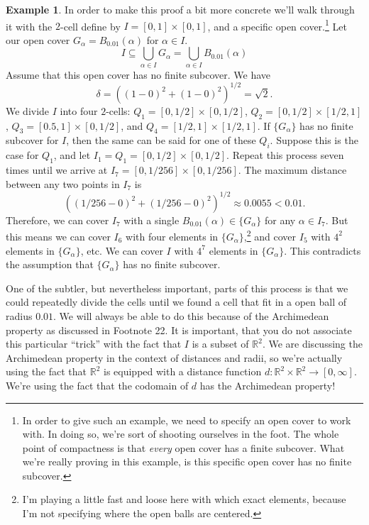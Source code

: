 \documentclass{article}
\newcommand{\R}{\mathbb{R}}
\theoremstyle{definition}
\newtheorem{example}{Example}[section]
\begin{document}
	\begin{example}
		In order to make this proof a bit more concrete we'll walk through it with the $ 2 $-cell define by $ I=[0,1]\times[0,1] $, and a specific open cover.\footnote{In order to give such an example, we need to specify an open cover to work with. In doing so, we're sort of shooting ourselves in the foot. The whole point of compactness is that \textit{every} open cover has a finite subcover. What we're really proving in this example, is this specific open cover has no finite subcover.} Let our open cover $ G_\alpha=B_{0.01}(\alpha)  $ for $ \alpha\in I $. $$ I\subseteq \bigcup_{\alpha\in I} G_\alpha=\bigcup_{\alpha\in I}B_{0.01}(\alpha)$$  Assume that this open cover has no finite subcover. We have $$ \delta=((1-0)^2+(1-0)^2)^{1/2}=\sqrt{2} .$$ We divide $ I $ into four $ 2 $-cells: $ Q_1=[0,1/2]\times[0,1/2] $, $Q_2=[0,1/2]\times[1/2,1]$, $ Q_3=[0.5,1]\times[0,1/2] $, and $ Q_4=[1/2,1]\times[1/2,1] $. If $ \{G_\alpha\} $ has no finite subcover for $ I $, then the same can be said for one of these $ Q_i $. Suppose this is the case for $ Q_1 $, and let $ I_1=Q_1=[0,1/2]\times[0,1/2] $. Repeat this process seven times until we arrive at $ I_7=[0,1/256]\times[0,1/256] $. The maximum distance between any two points in $ I_7 $ is $$ \left((1/256-0)^2+(1/256-0)^2\right)^{1/2}\approx0.0055<0.01.$$ Therefore, we can cover $ I_7 $ with a single $ B_{0.01}(\alpha) \in\{G_\alpha\}$ for any $ \alpha\in I_7 $. But this means we can cover $ I_6 $ with four elements in $ \{G_\alpha\} $,\footnote{I'm playing a little fast and loose here with which exact elements, because I'm not specifying where the open balls are centered.}  and cover $ I_5 $ with $ 4^2 $ elements in $ \{G_\alpha\}  $, etc. We can cover $ I $ with $ 4^7 $ elements in $ \{G_\alpha\} $. This contradicts the assumption that $ \{G_\alpha\} $ has no finite subcover. 
		
		One of the subtler, but nevertheless important, parts of this process is that we could repeatedly divide the cells until we found a cell that fit in a open ball of radius $ 0.01 $. We will always be able to do this because of the Archimedean property as discussed in Footnote 22. It is important, that you do not associate this particular ``trick'' with the fact that $ I $ is a subset of $ \R^2 $. We are discussing the Archimedean property in the context of distances and radii, so we're actually using the fact that $ \R^2  $ is equipped with a distance function $ d:\R^2\times\R^2\to[0,\infty] $. We're using the fact that the codomain of $ d $ has the Archimedean property!  
	\end{example}
\end{document}
